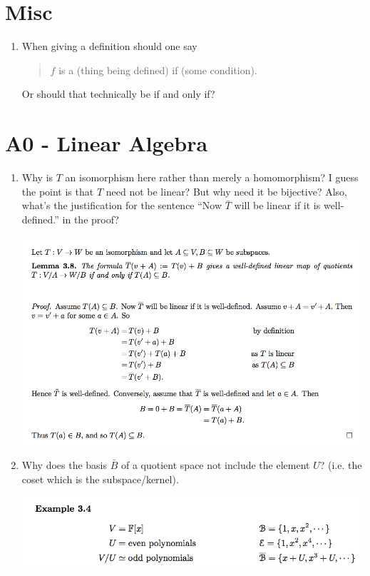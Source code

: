 \documentclass[12pt]{article}
\begin{document}
\section*{Misc}
\begin{enumerate}
\item When giving a definition should one say
  \begin{quote}
    $f$ is a (thing being defined) if (some condition).
  \end{quote}
  Or should that technically be if and only if?
\end{enumerate}

\section*{A0 - Linear Algebra}
\begin{enumerate}
\item Why is $T$ an isomorphism here rather than merely a homomorphism? I guess the point is that
  $T$ need not be linear? But why need it be bijective? Also, what's the justification for the
  sentence ``Now $\bar T$ will be linear if it is well-defined.'' in the proof?
  \begin{mdframed}
    \includegraphics[width=400pt]{img/questions-linear-algebra-a0-induced-map-well-defined-theorem.png}
  \end{mdframed}
\item Why does the basis $\bar B$ of a quotient space not include the element $U$? (i.e. the coset
  which is the subspace/kernel). 
  \begin{mdframed}
    \includegraphics[width=400pt]{img/questions-linear-algebra-a0-basis-of-quotient-space.png}

\end{mdframed}
\end{enumerate}
\end{document}
